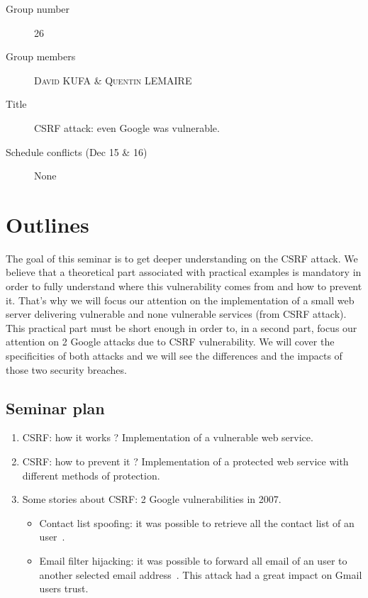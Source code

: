 \documentclass[a4paper,11pt]{article}
\begin{document}
  \begin{description}
   \item[Group number] 26
   \item[Group members] \textsc{David KUFA} \& \textsc{Quentin LEMAIRE}
   \item[Title] CSRF attack: even Google was vulnerable.
   \item[Schedule conflicts (Dec 15 \& 16)] None
  \end{description}

  \section{Outlines}
  The goal of this seminar is to get deeper understanding on the CSRF attack. We believe 
  that a theoretical part associated with practical examples is mandatory in order to fully understand 
  where this vulnerability comes from and how to prevent it. That's why we will focus our attention 
  on the implementation of a small web server delivering vulnerable and none vulnerable 
  services (from CSRF attack). This practical part must be short enough in order to, in a second part, focus our 
  attention on 2 Google attacks due to CSRF vulnerability. We will cover the specificities 
  of both attacks and we will see the differences and the impacts of those two security 
  breaches.
  
  \subsection{Seminar plan}
  
  \begin{enumerate}
   \item CSRF: how it works ? Implementation of a vulnerable web service.
   \item CSRF: how to prevent it ? Implementation of a protected web service with different methods of protection.
   \item Some stories about CSRF: 2 Google vulnerabilities in 2007.
   \begin{itemize}
    \item Contact list spoofing: it was possible to retrieve all the contact list of an user~\cite{gmail_contact_list_csrf, gmail_contact_list_csrf2}.
    \item Email filter hijacking: it was possible to forward all email of an user to another selected email address~\cite{gmail_hijack_csrf, gmail_hijack_csrf2}. This attack had a great impact on Gmail users trust.
   \end{itemize}
  \end{enumerate}
  
\end{document}

